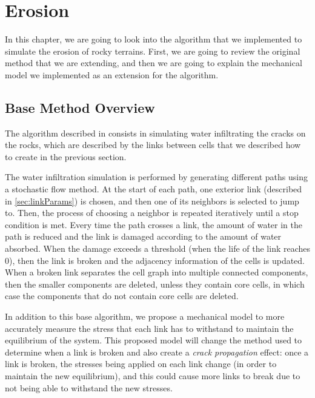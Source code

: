 \chapter{Erosion}

In this chapter, we are going to look into the algorithm that we 
implemented to simulate the erosion of rocky terrains. First, we are 
going to review the original method that we are extending, and then 
we are going to explain the mechanical model we implemented as an extension
for the algorithm.

\section{Base Method Overview}
The algorithm described in \cite{10.2312:ceig.20241139} consists in simulating
water infiltrating the cracks on the rocks, which are described by 
the links between cells that we described how to create in the previous 
section.
\vspace{10pt}

The water infiltration simulation is performed by generating different paths
using a stochastic flow method. At the start of each path, one exterior 
link (described in \ref{sec:linkParams}) is chosen, and then one of its neighbors 
is selected to jump to. Then, the process of choosing a neighbor is repeated 
iteratively until a stop condition is met. Every time the path crosses a 
link, the amount of water in the path is 
reduced and the link is damaged according to the amount of water absorbed. 
When the damage exceeds a threshold (when the life of the link reaches 0), 
then the link is broken and the adjacency information of the cells is updated.
When a broken link separates the cell graph into multiple connected components, 
then the smaller components are deleted, unless they contain core cells, in 
which case the components that do not contain core cells are deleted.

\vspace{10pt}

In addition to this base algorithm, we propose a mechanical model to more 
accurately measure the stress that each link has to withstand to maintain 
the equilibrium of the system. This proposed model will change the method 
used to determine when a link is broken and also create a \textit{crack propagation}
effect: once a link is broken, the stresses being 
applied on each link change (in order to maintain the new equilibrium), and 
this could cause more links to break due to not being able to withstand 
the new stresses. 


